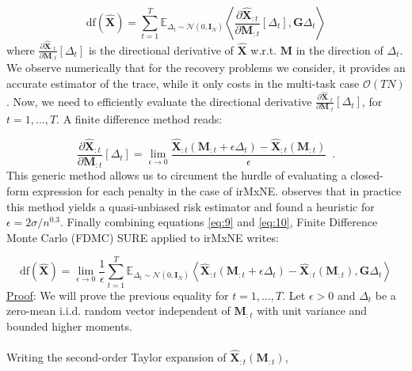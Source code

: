\begin{equation} \label{eq:9}
    \text{df}(\widehat{\mathbf{X}}) =
    \sum_{t=1}^T
    \mathbb{E}_{\Delta_t \sim \mathcal{N}(0, \mathbf{I}_N)}
    \left\langle
        \frac{
            \partial \widehat{\mathbf{X}}_{:t}
        }{
            \partial \mathbf{M}_{:t}
        }[\Delta_t],
        \mathbf{G}\Delta_t
    \right\rangle
\end{equation}
%
where $\frac{\partial \widehat{\mathbf{X}}_{:t}}{\partial \mathbf{M}_{:t}}[\Delta_t]$ is the directional derivative of $\widehat{\mathbf{X}}$ w.r.t.
$\mathbf{M}$ in the direction of $\Delta_t$.
We observe numerically that for the recovery problems we consider, it provides an accurate estimator of the trace, while it only
costs in the multi-task case $\mathcal{O}(TN)$. Now, we need to efficiently evaluate the directional derivative
$\frac{\partial \widehat{\mathbf{X}}_{:t}}{\partial \mathbf{M}_{:t}}[\Delta_t]$, for $t=1,\dots, T$. A finite difference method reads:

\begin{equation} \label{eq:10}
    \frac{\partial \widehat{\mathbf{X}}_{:t}}{\partial \mathbf{M}_{:t}}
    [\Delta_t]
    = \lim_{\epsilon \rightarrow 0}
    \frac{
        \widehat{\mathbf{X}}_{:t}(\mathbf{M}_{:t} + \epsilon \Delta_t)
        -
        \widehat{\mathbf{X}}_{:t}(\mathbf{M}_{:t})
    }{\epsilon}
    \enspace .
\end{equation}
%
This generic method allows us to circument the hurdle of evaluating a closed-form expression for each penalty
in the case of irMxNE. \cite{Deledalle_Vaiter_Fadili_Peyre14} observes that in practice this method yields a
quasi-unbiased risk estimator and found a heuristic for $\epsilon = 2\sigma / n^{0.3}$. Finally combining equations
\eqref{eq:9} and \eqref{eq:10}, Finite Difference Monte Carlo (FDMC) SURE applied to irMxNE writes:

\begin{equation} \label{eq:11}
    \text{df}(\widehat{\mathbf{X}}) =
    \lim_{\epsilon \rightarrow 0}
    \frac{1}{\epsilon}
    \sum_{t=1}^T
    \mathbb{E}_{\Delta_t \sim \mathcal{N}(0, \mathbf{I}_N)}
    \left\langle
        \widehat{\mathbf{X}}_{:t}(\mathbf{M}_{:t} + \epsilon \Delta_t)
        -
        \widehat{\mathbf{X}}_{:t}(\mathbf{M}_{:t})
        ,
        \mathbf{G}\Delta_t
    \right\rangle
\end{equation}
%
\underline{Proof}: We will prove the previous equality for $t=1, \dots, T$. Let
$\epsilon > 0$ and $\Delta_t$ be a zero-mean i.i.d. random vector independent of
$\mathbf{M}_{:t}$ with unit variance and bounded higher moments.
\\
\\
Writing the second-order Taylor expansion of $\widehat{\mathbf{X}}_{:t}(\mathbf{M}_{:t})$,

